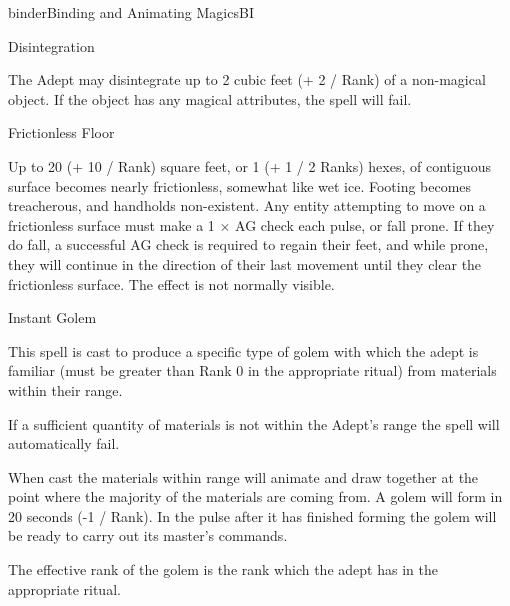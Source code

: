 \begin{College}[1.2]{binder}{Binding and Animating Magics}{BI}
\begin{spell}[S-2]{Disintegration}
\begin{effects}
The Adept may disintegrate up to 2 cubic feet (+ 2 / Rank) of a
non-magical object.  If the object has any magical attributes, the
spell will fail.
\end{effects}
\end{spell}

\begin{spell}[S-3]{Frictionless Floor}
\begin{effects}
Up to 20 (+ 10 / Rank) square feet, or 1 (+ 1 / 2 Ranks) hexes, of
contiguous surface becomes nearly frictionless, somewhat like wet
ice. Footing becomes treacherous, and handholds non-existent.  Any
entity attempting to move on a frictionless surface must make a 1 × AG
check each pulse, or fall prone. If they do fall, a successful AG
check is required to regain their feet, and while prone, they will
continue in the direction of their last movement until they clear the
frictionless surface.  The effect is not normally visible.
\end{effects}
\end{spell}

\begin{spell}[S-4]{Instant Golem}
\begin{effects}
This spell is cast to produce a specific type of golem with which the
adept is familiar (must be greater than Rank 0 in the appropriate
ritual) from materials within their range.

If a sufficient quantity of materials is not within the Adept’s range
the spell will automatically fail.

When cast the materials within range will animate and draw together at
the point where the majority of the materials are coming from.  A
golem will form in 20 seconds (-1 / Rank). In the pulse after it has
finished forming the golem will be ready to carry out its master’s
commands.

The effective rank of the golem is the rank which the adept has in the
appropriate ritual.


\end{effects}
\end{spell}
\end{College}
